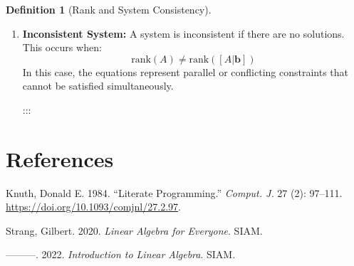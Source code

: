 \documentclass[
  letterpaper,
  DIV=11,
  numbers=noendperiod]{scrreprt}
\providecommand{\tightlist}{%
  \setlength{\itemsep}{0pt}\setlength{\parskip}{0pt}}\usepackage{longtable,booktabs,array}
\newlength{\cslhangindent}
\newenvironment{CSLReferences}[2] %
 {\begin{list}{}{%
  \setlength{\itemindent}{0pt}
  \setlength{\leftmargin}{0pt}
  \setlength{\parsep}{0pt}
  \ifodd #1
   \setlength{\leftmargin}{\cslhangindent}
   \setlength{\itemindent}{-1\cslhangindent}
  \fi
  \setlength{\itemsep}{#2\baselineskip}}}
 {\end{list}}
\theoremstyle{plain}
\theoremstyle{definition}
\newtheorem{definition}{Definition}[chapter]
\theoremstyle{remark}
\begin{document}
\begin{tcolorbox}
\begin{definition}[Rank and System
Consistency]
\begin{enumerate}
  \begin{itemize}
  \tightlist
  \item
    \textbf{Unique} if the rank equals the number of variables.
  \item
    \textbf{Infinitely many} if the rank is less than the number of
    variables.
  \end{itemize}
\item
  \textbf{Inconsistent System:} A system is inconsistent if there are no
  solutions. This occurs when:
  \[\text{rank}(A) \ne \text{rank}([A|\mathbf{b}])\] In this case, the
  equations represent parallel or conflicting constraints that cannot be
  satisfied simultaneously.

  :::
\end{enumerate}


\chapter*{References}\label{references}


\label{refs}
\begin{CSLReferences}{1}{0}
Knuth, Donald E. 1984. {``Literate Programming.''} \emph{Comput. J.} 27
(2): 97--111. \url{https://doi.org/10.1093/comjnl/27.2.97}.

Strang, Gilbert. 2020. \emph{Linear Algebra for Everyone}. SIAM.

---------. 2022. \emph{Introduction to Linear Algebra}. SIAM.

\end{CSLReferences}

\end{definition}

\end{tcolorbox}
\end{document}
